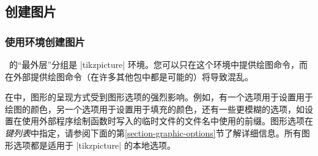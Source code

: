 \subsection{创建图片}

\subsubsection{使用环境创建图片}


\tikzname\ 的``最外层''分组是 |{tikzpicture}| 环境。您可以只在这个环境中提供绘图命令，而在外部提供绘图命令（在许多其他包中都是可能的）将导致混乱。


在\tikzname 中，图形的呈现方式受到图形选项的强烈影响。例如，有一个选项用于设置用于绘图的颜色，另一个选项用于设置用于填充的颜色，还有一些更模糊的选项，如设置在使用外部程序绘制函数时写入的临时文件的文件名中使用的前缀。图形选项在\emph{键列表}中指定，请参阅下面的第\ref{section-graphic-options}节了解详细信息。所有图形选项都是适用于 |{tikzpicture}| 的本地选项。

